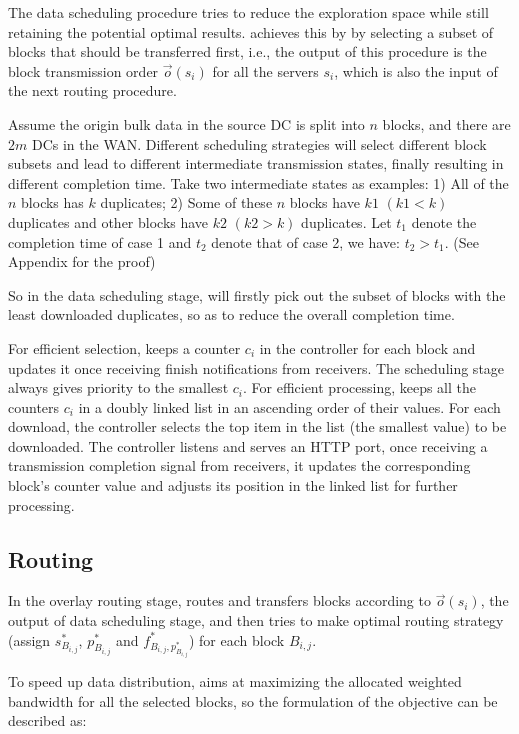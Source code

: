 The data scheduling procedure tries to reduce the exploration space while still retaining the potential optimal results. \name achieves this by by selecting a subset of blocks that should be transferred first, i.e., the output of this procedure is the block transmission order $\overrightarrow{o}(s_i)$ for all the servers $s_i$, which is also the input of the next routing procedure.

Assume the origin bulk data in the source DC is split into $n$ blocks, and there are $2m$ DCs in the WAN. Different scheduling strategies will select different block subsets and lead to different intermediate transmission states, finally resulting in different completion time. Take two intermediate states as examples: 1) All of the $n$ blocks has $k$ duplicates; 2) Some of these $n$ blocks have $k1$ $(k1<k)$ duplicates and other blocks have $k2$ $(k2>k)$ duplicates. Let $t_1$ denote the completion time of case 1 and $t_2$ denote that of case 2, we have: $t_2 > t_1$. (See Appendix for the proof)

So in the data scheduling stage, \name will firstly pick out the subset of blocks with the least downloaded duplicates, so as to reduce the overall completion time.

For efficient selection, \name keeps a counter $c_i$ in the controller for each block and updates it once receiving finish notifications from receivers. The scheduling stage always gives priority to the smallest $c_i$. For efficient processing, \name keeps all the counters $c_i$ in a doubly linked list in an ascending order of their values. For each download, the controller selects the top item in the list (the smallest value) to be downloaded. The controller listens and serves an HTTP port, once receiving a transmission completion signal from receivers, it updates the corresponding block's counter value and adjusts its position in the linked list for further processing.

\subsection{Routing}
\label{subsec:logic:routing}

In the overlay routing stage, \name routes and transfers blocks according to $\overrightarrow{o}(s_i)$, the output of data scheduling stage, and then tries to make optimal routing strategy (assign $s_{B_{i,j}}^*$, $p_{B_{i,j}}^*$ and $f^*_{B_{i,j},p_{B_{i,j}}^*}$) for each block $B_{i,j}$.

To speed up data distribution, \name aims at maximizing the allocated weighted bandwidth for all the selected blocks, so the formulation of the objective can be described as:

